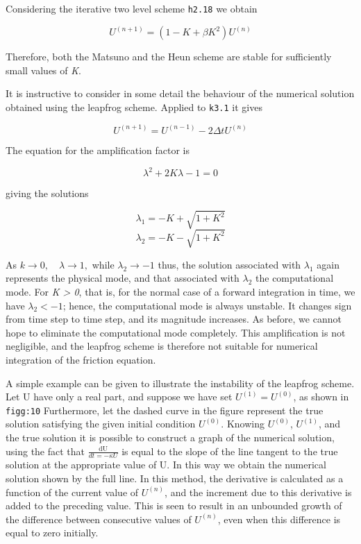 Considering the iterative two level scheme \texttt{h2.18} we obtain

\[U^{\left( n + 1 \right)} = \left( 1 - K + \beta K^{2} \right)U^{\left( n \right)}\]

Therefore, both the Matsuno and the Heun scheme are stable for
sufficiently small values of \emph{K}.

It is instructive to consider in some detail the behaviour of the
numerical solution obtained using the leapfrog scheme. Applied to
\texttt{k3.1} it gives

\[U^{\left( n + 1 \right)} = U^{\left( n - 1 \right)} - 2\Delta t U^{\left( n \right)}\]

The equation for the amplification factor is

\[\lambda^{2} + 2K\lambda - 1 = 0\]

giving the solutions

\[\lambda_{1} = - K + \sqrt{1 + K^{2}}\]\[\lambda_{2} = - K - \sqrt{1 + K^{2}}\]

As \(k \rightarrow 0, \quad \lambda \rightarrow 1,\) while
\(\lambda_{2} \rightarrow - 1\) thus, the solution associated with
\(\lambda_{1}\) again represents the physical mode, and that associated
with \(\lambda_{2}\) the computational mode. For \emph{K \textgreater{}
0}, that is, for the normal case of a forward integration in time, we
have \(\lambda_{2} < - 1\); hence, the computational mode is always
unstable. It changes sign from time step to time step, and its magnitude
increases. As before, we cannot hope to eliminate the computational
mode completely. This amplification is not negligible, and the leapfrog
scheme is therefore not suitable for numerical integration of the
friction equation.

A simple example can be given to illustrate the instability of the
leapfrog scheme. Let U have only a real part, and suppose we have set
\(U^{( 1 )} = U^{( 0 )}\), as shown in \texttt{figg:10} Furthermore, let
the dashed curve in the figure represent the true solution satisfying
the given initial condition \(U^{\left( 0 \right)}\). Knowing
\(U^{\left( 0 \right)}\), \(U^{\left( 1 \right)}\), and the true
solution it is possible to construct a graph of the numerical solution,
using the fact that \(\frac{\text{dU}}{dt = - \kappa U}\) is equal to
the slope of the line tangent to the true solution at the appropriate
value of U. In this way we obtain the numerical solution shown by the
full line. In this method, the derivative is calculated as a function
of the current value of \(U^{\left( n \right)}\), and the increment due
to this derivative is added to the preceding value. This is seen to
result in an unbounded growth of the difference between consecutive
values of \(U^{\left( n \right)}\), even when this difference is equal
to zero initially.

